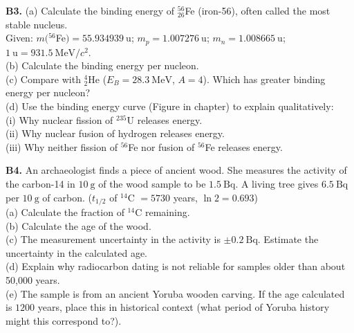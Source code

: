 \begin{exercisebox}[28]
\vspace{0.4cm}

\textbf{B3.} (a) Calculate the binding energy of
${}^{56}_{26}$Fe (iron-56), often called the most
stable nucleus.\\
Given: $m({}^{56}$Fe$) = 55.934939\ \text{u}$;
$m_p = 1.007276\ \text{u}$;
$m_n = 1.008665\ \text{u}$;
$1\ \text{u} = 931.5\ \text{MeV}/c^2$.\\[4pt]
(b) Calculate the binding energy per nucleon.\\
(c) Compare with ${}^4_2$He
($E_B = 28.3\ \text{MeV}$, $A = 4$).
Which has greater binding energy per nucleon?\\
(d) Use the binding energy curve (Figure in chapter)
to explain qualitatively:\\
(i) Why nuclear fission of ${}^{235}$U releases energy.\\
(ii) Why nuclear fusion of hydrogen releases energy.\\
(iii) Why neither fission of ${}^{56}$Fe nor fusion
of ${}^{56}$Fe releases energy.
\hfill{}

\vspace{0.4cm}

\textbf{B4.} An archaeologist finds a piece of
ancient wood. She measures the activity of the
carbon-14 in $10\ \text{g}$ of the wood sample
to be $1.5\ \text{Bq}$.
A living tree gives $6.5\ \text{Bq}$ per $10\ \text{g}$
of carbon.
($t_{1/2}$ of ${}^{14}$C $= 5730$ years,
$\ln 2 = 0.693$)\\[4pt]
(a) Calculate the fraction of ${}^{14}$C remaining.\\
(b) Calculate the age of the wood.\\
(c) The measurement uncertainty in the activity
is $\pm 0.2\ \text{Bq}$. Estimate the uncertainty
in the calculated age.\\
(d) Explain why radiocarbon dating is not reliable
for samples older than about 50,000 years.\\
(e) The sample is from an ancient Yoruba wooden
carving. If the age calculated is $1200$ years,
place this in historical context (what period of
Yoruba history might this correspond to?).
\hfill{}

\vspace{0.4cm}


\end{exercisebox}
